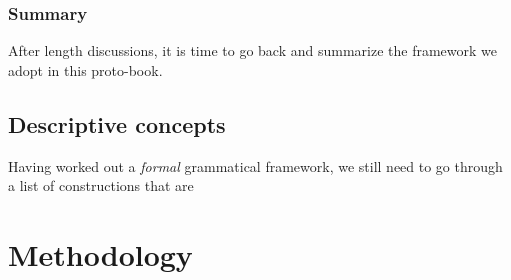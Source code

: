 \documentclass[../main.tex]{subfiles}
\begin{document}
\subsubsection{Summary}

After length discussions, it is time to go back and summarize the framework we adopt in this proto-book.

\subsection{Descriptive concepts}


Having worked out a \emph{formal} grammatical framework, we still need to go through a list of constructions 
that are 


\section{Methodology}

\end{document}
